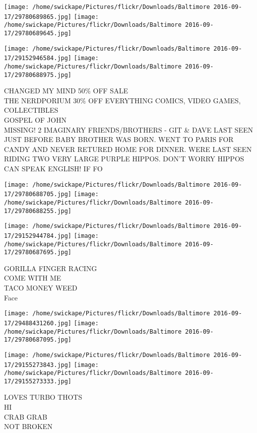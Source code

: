 \documentclass[10pt,letterpaper]{article}
\begin{document}
\texttt{[image: /home/swickape/Pictures/flickr/Downloads/Baltimore 2016-09-17/29780689865.jpg]}
\texttt{[image: /home/swickape/Pictures/flickr/Downloads/Baltimore 2016-09-17/29780689645.jpg]}

\texttt{[image: /home/swickape/Pictures/flickr/Downloads/Baltimore 2016-09-17/29152946584.jpg]}
\texttt{[image: /home/swickape/Pictures/flickr/Downloads/Baltimore 2016-09-17/29780688975.jpg]}

CHANGED MY MIND 50\% OFF SALE\\
THE NERDPORIUM 30\% OFF EVERYTHING COMICS, VIDEO GAMES, COLLECTIBLES\\
GOSPEL OF JOHN\\
MISSING!  2 IMAGINARY FRIENDS/BROTHERS {-} GIT \& DAVE LAST SEEN JUST BEFORE BABY BROTHER WAS BORN.  WENT TO PARIS FOR CANDY AND NEVER RETURED HOME FOR DINNER.  WERE LAST SEEN RIDING TWO VERY LARGE PURPLE HIPPOS.  DON'T WORRY HIPPOS CAN SPEAK ENGLISH!  IF FO\\
\pagebreak

\texttt{[image: /home/swickape/Pictures/flickr/Downloads/Baltimore 2016-09-17/29780688705.jpg]}
\texttt{[image: /home/swickape/Pictures/flickr/Downloads/Baltimore 2016-09-17/29780688255.jpg]}

\texttt{[image: /home/swickape/Pictures/flickr/Downloads/Baltimore 2016-09-17/29152944784.jpg]}
\texttt{[image: /home/swickape/Pictures/flickr/Downloads/Baltimore 2016-09-17/29780687695.jpg]}

GORILLA FINGER RACING\\
COME WITH ME\\
TACO MONEY WEED\\
Face\\
\pagebreak

\texttt{[image: /home/swickape/Pictures/flickr/Downloads/Baltimore 2016-09-17/29488431260.jpg]}
\texttt{[image: /home/swickape/Pictures/flickr/Downloads/Baltimore 2016-09-17/29780687095.jpg]}

\texttt{[image: /home/swickape/Pictures/flickr/Downloads/Baltimore 2016-09-17/29155273843.jpg]}
\texttt{[image: /home/swickape/Pictures/flickr/Downloads/Baltimore 2016-09-17/29155273333.jpg]}

LOVES TURBO THOTS\\
HI\\
CRAB GRAB\\
NOT BROKEN\\
\pagebreak
\end{document}
